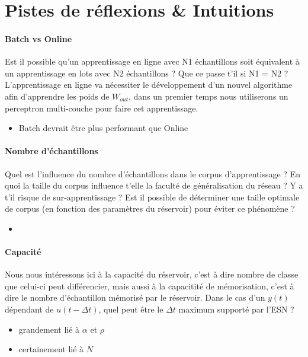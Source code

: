 \documentclass[12pt]{article}
\begin{document}
\section{Pistes de réflexions \& Intuitions}

\paragraph{Batch vs Online}
Est il possible qu'un apprentissage en ligne avec N1 échantillons soit équivalent à un apprentissage en lots avec N2 échantillons ? Que ce passe t'il si N1 = N2 ? L'apprentissage en ligne va nécessiter le développement d'un nouvel algorithme afin d'apprendre les poids de $W_{out}$, dans un premier temps nous utiliserons un perceptron multi-couche pour faire cet apprentissage.

\begin{itemize}
\item Batch devrait être plus performant que Online
\end{itemize}

\paragraph{Nombre d'échantillons}
Quel est l'influence du nombre d'échantillons dans le corpus d'apprentissage ? En quoi la taille du corpus influence t'elle la faculté de généralisation du réseau ? Y a t'il risque de sur-apprentissage ? Est il possible de déterminer une taille optimale de corpus (en fonction des paramètres du réservoir) pour éviter ce phénomène ?

\begin{itemize}
\item 
\end{itemize}

\paragraph{Capacité}
Nous nous intéressons ici à la capacité du réservoir, c'est à dire nombre de classe que celui-ci peut différencier, mais aussi à la capacitité de mémorisation, c'est à dire le nombre d'échantillon mémorisé par le réservoir. Dans le cas d'un $y(t)$ dépendant de $u(t-\Delta t)$, quel peut être le $\Delta t$ maximum supporté par l'ESN ?

\begin{itemize}
\item grandement lié à $\alpha$ et $\rho$
\item certainement lié à $N$
\end{itemize}
\end{document}
